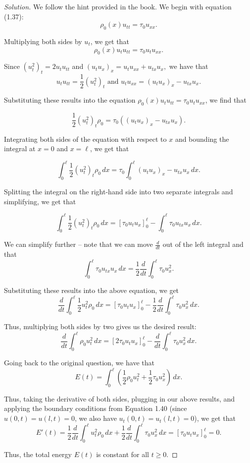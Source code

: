 \documentclass[11pt]{article}
\newenvironment{solution}
  {\renewcommand\qedsymbol{$\blacksquare$}\begin{proof}[Solution]}
  {\end{proof}}
\begin{document}
\begin{solution} 
We follow the hint provided in the book. We begin with equation (1.37): $$ \rho_0 (x) u_{tt} = \tau_0 u_{xx}.$$

Multiplying both sides by $u_t$, we get that $$ \rho_0 (x) u_t u_{tt} = \tau_0 u_t u_{xx}.$$

Since $(u_t^2)_t = 2u_tu_{tt}$ and $(u_tu_x)_x = u_tu_{xx} + u_{tx} u_x,$ we have that $$u_tu_{tt} = \frac{1}{2}\left(u_t^2\right)_t \text { and } u_tu_{xx} = (u_tu_x)_x - u_{tx}u_x.$$

Substituting these results into the equation $ \rho_0 (x) u_t u_{tt} = \tau_0 u_t u_{xx}$, we find that

$$ \frac{1}{2} \left(u_t^2\right)_t \rho_0 = \tau_0 \left( (u_tu_x)_x - u_{tx}u_x\right).$$

Integrating both sides of the equation with respect to $x$ and bounding the integral at $x=0$ and $x = \ell$, we get that

$$ \int_0^{\ell} \frac{1}{2} \left(u_t^2\right)_t \rho_0 \, dx = \tau_0 \int_0^{\ell} (u_tu_x)_x - u_{tx} u_x \, dx.$$


Splitting the integral on the right-hand side into two separate integrals and simplifying, we get that

$$ \int_0^{\ell} \frac{1}{2} \left(u_t^2\right)_t \rho_0 \, dx = [\tau_0u_tu_x]_0^{\ell} - \int_0^{\ell} \tau_0u_{tx} u_x \, dx.$$

We can simplify further -- note that we can move $\frac{d}{dt}$ out of the left integral and that $$\int_0^{\ell} \tau_0u_{tx} u_x \, dx = \frac{1}{2} \frac{d}{dt} \int_0^{\ell} \tau_0 u_x^2.$$

Substituting these results into the above equation, we get
$$ \frac{d}{dt} \int_0^{\ell} \frac{1}{2} u_t^2 \rho_0 \, dx = [\tau_0u_tu_x]_0^{\ell} - \frac{1}{2} \frac{d}{dt} \int_0^{\ell} \tau_0u_x^2 \, dx.$$

Thus, multiplying both sides by two gives us the desired result:
$$\frac{d}{dt} \int_{0}^{\ell} \rho_0 u_t^2 \, dx= [2\tau_0u_tu_x]_0^\ell - \frac{d}{dt}  \int_{0}^{\ell} \tau_0 u_x^2 \, dx.$$ 

Going back to the original question, we have that $$E(t) = \int_{0}^{\ell} \left( \frac{1}{2} \rho_0 u_t^2 + \frac{1}{2} \tau_0 u_x^2 \right) \, dx.$$

Thus, taking the derivative of both sides, plugging in our above results, and applying the boundary conditions from Equation 1.40 (since $u(0, t) = u(l, t) = 0$, we also have $u_t(0, t) = u_t(l, t) = 0$), we get that
$$E'(t) =  \frac{1}{2} \frac{d}{dt} \int_0^{\ell} u_t^2 \rho_0 \, dx + \frac{1}{2} \frac{d}{dt} \int_0^{\ell} \tau_0u_x^2 \, dx = [\tau_0u_tu_x]_0^{\ell} = 0. $$

Thus, the total energy $E(t)$ is constant for all $t \geq 0.$
\end{solution}
\end{document}
